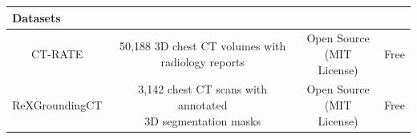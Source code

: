 \begin{table}[ht]
{\begin{tabular}{|c|c|c|c|}
        \multicolumn{4}{|l|}{\textbf{Datasets}} \\ \hline
        CT-RATE &
        \makecell[l]{50,188 3D chest CT volumes with \\ radiology reports} &
        \makecell[l]{Open Source \\ (MIT License)} &
        Free \\ \hline

        ReXGroundingCT &
        \makecell[l]{3,142 chest CT scans with annotated \\ 3D segmentation masks} &
        \makecell[l]{Open Source \\ (MIT License)} &
        Free \\ \hline
    \end{tabular}%
    }
\end{table}
